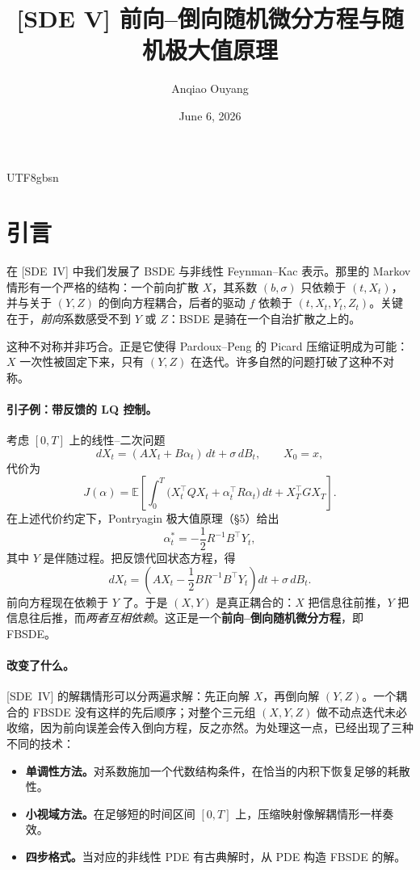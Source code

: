 \documentclass{article}
\title{[SDE V] 前向--倒向随机微分方程与随机极大值原理}
\author{Anqiao Ouyang}
\date{June 6, 2026}
\theoremstyle{plain}
\theoremstyle{definition}
\theoremstyle{remark}
\numberwithin{equation}{section}
\newcommand{\E}{\mathbb{E}}
\begin{document}
\begin{CJK*}{UTF8}{gbsn}

\maketitle

\section{引言}

在 [SDE~IV] 中我们发展了 BSDE 与非线性 Feynman--Kac 表示。那里的 Markov 情形有一个严格的结构：一个前向扩散 $X$，其系数 $(b,\sigma)$ 只依赖于 $(t,X_t)$，并与关于 $(Y,Z)$ 的倒向方程耦合，后者的驱动 $f$ 依赖于 $(t,X_t,Y_t,Z_t)$。关键在于，\emph{前向}系数感受不到 $Y$ 或 $Z$：BSDE 是骑在一个自治扩散之上的。

这种不对称并非巧合。正是它使得 Pardoux--Peng 的 Picard 压缩证明成为可能：$X$ 一次性被固定下来，只有 $(Y,Z)$ 在迭代。许多自然的问题打破了这种不对称。

\paragraph{引子例：带反馈的 LQ 控制。}
考虑 $[0,T]$ 上的线性--二次问题
\[
  dX_t=(AX_t+B\alpha_t)\,dt+\sigma\,dB_t,\qquad X_0=x,
\]
代价为
\[
  J(\alpha)=\E\!\left[\int_0^T\bigl(X_t^\top QX_t+\alpha_t^\top R\alpha_t\bigr)\,dt+X_T^\top GX_T\right].
\]
在上述代价约定下，Pontryagin 极大值原理（\S5）给出
\[
  \alpha_t^*=-\frac12 R^{-1}B^\top Y_t,
\]
其中 $Y$ 是伴随过程。把反馈代回状态方程，得
\[
  dX_t=\left(AX_t-\frac12 BR^{-1}B^\top Y_t\right)dt+\sigma\,dB_t.
\]
前向方程现在依赖于 $Y$ 了。于是 $(X,Y)$ 是真正耦合的：$X$ 把信息往前推，$Y$ 把信息往后推，而\emph{两者互相依赖}。这正是一个\textbf{前向--倒向随机微分方程}，即 FBSDE。

\paragraph{改变了什么。} [SDE~IV] 的解耦情形可以分两遍求解：先正向解 $X$，再倒向解 $(Y,Z)$。一个耦合的 FBSDE 没有这样的先后顺序；对整个三元组 $(X,Y,Z)$ 做不动点迭代未必收缩，因为前向误差会传入倒向方程，反之亦然。为处理这一点，已经出现了三种不同的技术：
\begin{itemize}
  \item \textbf{单调性方法。}对系数施加一个代数结构条件，在恰当的内积下恢复足够的耗散性。
  \item \textbf{小视域方法。}在足够短的时间区间 $[0,T]$ 上，压缩映射像解耦情形一样奏效。
  \item \textbf{四步格式。}当对应的非线性 PDE 有古典解时，从 PDE 构造 FBSDE 的解。
\end{itemize}


\end{CJK*}
\end{document}
